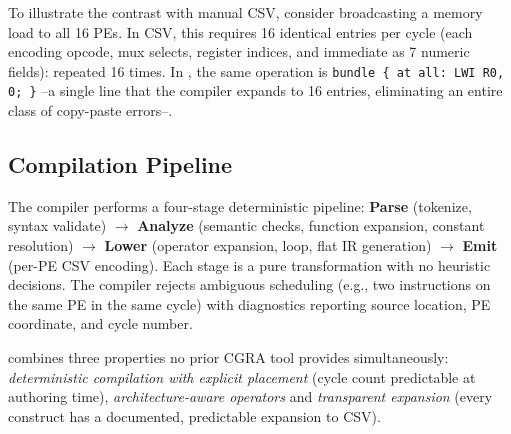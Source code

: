 To illustrate the contrast with manual CSV, consider broadcasting a memory load to all 16 PEs. In CSV, this requires 16 identical entries per cycle (each encoding opcode, mux selects, register indices, and immediate as 7 numeric fields):  repeated 16 times. In \castm{}, the same operation is \mbox{\texttt{bundle \{ at all: LWI R0, 0; \}}} --a single line that the compiler expands to 16 entries, eliminating an entire class of copy-paste errors--.

\subsection{Compilation Pipeline}
\label{subsec:pipeline}

The compiler performs a four-stage deterministic pipeline:
\textbf{Parse} (tokenize, syntax validate) $\to$ \textbf{Analyze} (semantic checks, function expansion, constant resolution) $\to$ \textbf{Lower} (operator expansion, loop, flat IR generation) $\to$ \textbf{Emit} (per-PE CSV encoding). Each stage is a pure transformation with no heuristic decisions. The compiler rejects ambiguous scheduling (e.g., two instructions on the same PE in the same cycle) with diagnostics reporting source location, PE coordinate, and cycle number.

\castm{} combines three properties no prior CGRA tool provides simultaneously: \emph{deterministic compilation with explicit placement} (cycle count predictable at authoring time), \emph{architecture-aware operators}
and \emph{transparent expansion} (every construct has a documented, predictable expansion to CSV).



